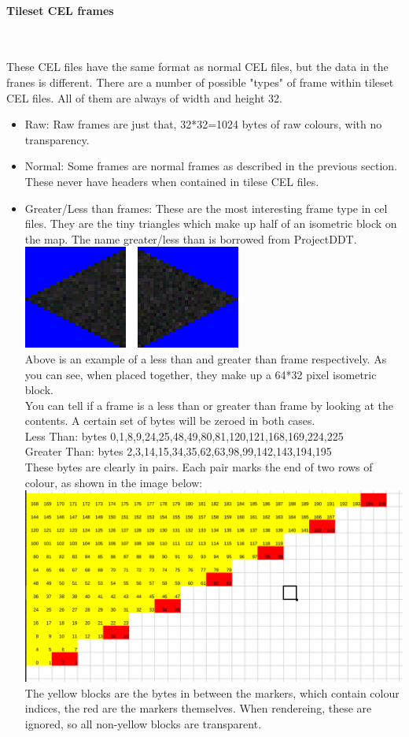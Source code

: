 \documentclass[a4paper]{article}
\newcommand{\subsubsubsection}[1] 
{
	\paragraph{#1}
	\mbox{}\\
	
	\noindent
}
\begin{document}
\subsubsubsection{Tileset CEL frames}
	These CEL files have the same format as normal CEL files, but the data in the franes is different. There are a number of possible "types" of frame within tileset CEL files. All of them are always of width and height 32.
\begin{itemize}

	\item{Raw:} Raw frames are just that, 32*32=1024 bytes of raw colours, with no transparency. 
	
	\item{Normal:} Some frames are normal frames as described in the previous section. These never have headers when contained in tilese CEL files.
	
	\item{Greater/Less than frames:} These are the most interesting frame type in cel files. They are the tiny triangles which make up half of an isometric block on the map. The name greater/less than is borrowed from ProjectDDT\cite{ddt}. \\
\includegraphics{ltgt}\\ Above is an example of a less than and greater than frame respectively. As you can see, when placed together, they make up a 64*32 pixel isometric block.\\
You can tell if a frame is a less than or greater than frame by looking at the contents. A certain set of bytes will be zeroed in both cases.\\
Less Than: bytes 0,1,8,9,24,25,48,49,80,81,120,121,168,169,224,225\\
Greater Than: bytes 2,3,14,15,34,35,62,63,98,99,142,143,194,195\\

	These bytes are clearly in pairs. Each pair marks the end of two rows of colour, as shown in the image below:\\
\includegraphics[scale=0.3]{ltgt-markers}\\
The yellow blocks are the bytes in between the markers, which contain colour indices, the red are the markers themselves. When rendereing, these are ignored, so all non-yellow blocks are transparent.


\end{itemize}
\end{document}
